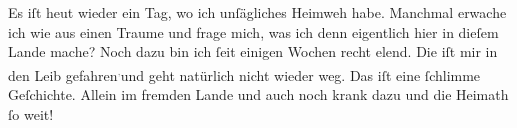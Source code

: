 \pstart
           {\pb}Es iſt heut wieder
               ein Tag, wo ich unſägliches Heimweh habe. Manchmal erwache ich wie aus einen Traume
               und frage\strikeout{,} mich, was ich denn eigentlich hier in
               dieſem Lande mache? Noch dazu
               bin ich ſeit einigen Wochen recht elend. Die \label{K_L02858-3v}\label{K_L02858-3} iſt mir in den
               Leib gefahren\substVorne{}\textsuperscript{\textcolor{gray}{,}}\substDazwischen{}{ }und\substHinten{} geht natürlich nicht wieder weg. Das iſt eine ſchlimme Geſchichte. Allein im
               fremden Lande und auch noch
               krank dazu und die Heimath ſo weit! {\dotsfive}\pend
           
